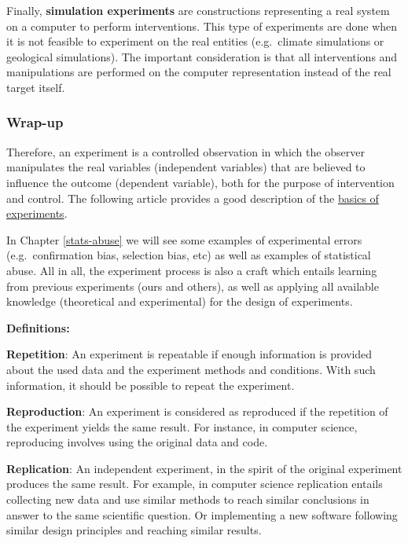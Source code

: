 \documentclass[
]{book}
\begin{document}
Finally, \textbf{simulation experiments} are constructions representing a real system on a computer to perform interventions. This type of experiments are done when it is not feasible to experiment on the real entities (e.g.~climate simulations or geological simulations). The important consideration is that all interventions and manipulations are performed on the computer representation instead of the real target itself.

\hypertarget{wrap-up}{%
\subsubsection{Wrap-up}\label{wrap-up}}

Therefore, an experiment is a controlled observation in which the observer manipulates the real variables (independent variables) that are believed to influence the outcome (dependent variable), both for the purpose of intervention and control. The following article provides a good description of the \href{https://opentextbc.ca/researchmethods/chapter/experiment-basics/}{basics of experiments}.

In Chapter \ref{stats-abuse} we will see some examples of experimental errors (e.g.~confirmation bias, selection bias, etc) as well as examples of statistical abuse. All in all, the experiment process is also a craft which entails learning from previous experiments (ours and others), as well as applying all available knowledge (theoretical and experimental) for the design of experiments.

\begin{tipbox}

\textbf{Definitions:}

\textbf{Repetition}: An experiment is repeatable if enough information is provided about the used data and the experiment methods and conditions. With such information, it should be possible to repeat the experiment.

\textbf{Reproduction}: An experiment is considered as reproduced if the repetition of the experiment yields the same result. For instance, in computer science, reproducing involves using the original data and code.

\textbf{Replication}: An independent experiment, in the spirit of the original experiment produces the same result. For example, in computer science replication entails collecting new data and use similar methods to reach similar conclusions in answer to the same scientific question. Or implementing a new software following similar design principles and reaching similar results.

\end{tipbox}
\end{document}
